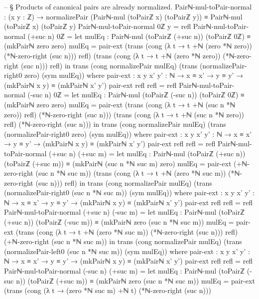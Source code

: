\documentclass[11pt,a4paper]{book}
\begin{document}
\begin{code}
-- § Products of canonical pairs are already normalized.
Pairℕ-mul-toPair-normal : (x y : ℤ) →
  normalizePair (Pairℕ-mul (toPairℤ x) (toPairℤ y)) ≡ Pairℕ-mul (toPairℤ x) (toPairℤ y)
Pairℕ-mul-toPair-normal 0ℤ y = refl
Pairℕ-mul-toPair-normal (+suc n) 0ℤ =
  let mulEq : Pairℕ-mul (toPairℤ (+suc n)) (toPairℤ 0ℤ) ≡ (mkPairℕ zero zero)
      mulEq =
        pair-ext
          (trans (cong (λ t → t +ℕ (zero *ℕ zero)) (*ℕ-zero-right (suc n))) refl)
          (trans (cong (λ t → t +ℕ (zero *ℕ zero)) (*ℕ-zero-right (suc n))) refl)
  in
  trans (cong normalizePair mulEq) (trans (normalizePair-right0 zero) (sym mulEq))
  where
    pair-ext : {x y x' y' : ℕ} → x ≡ x' → y ≡ y' → (mkPairℕ x y) ≡ (mkPairℕ x' y')
    pair-ext refl refl = refl
Pairℕ-mul-toPair-normal (-suc n) 0ℤ =
  let mulEq : Pairℕ-mul (toPairℤ (-suc n)) (toPairℤ 0ℤ) ≡ (mkPairℕ zero zero)
      mulEq =
        pair-ext
          (trans (cong (λ t → t +ℕ (suc n *ℕ zero)) refl) (*ℕ-zero-right (suc n)))
          (trans (cong (λ t → t +ℕ (suc n *ℕ zero)) refl) (*ℕ-zero-right (suc n)))
  in
  trans (cong normalizePair mulEq) (trans (normalizePair-right0 zero) (sym mulEq))
  where
    pair-ext : {x y x' y' : ℕ} → x ≡ x' → y ≡ y' → (mkPairℕ x y) ≡ (mkPairℕ x' y')
    pair-ext refl refl = refl
Pairℕ-mul-toPair-normal (+suc n) (+suc m) =
  let mulEq : Pairℕ-mul (toPairℤ (+suc n)) (toPairℤ (+suc m)) ≡ (mkPairℕ (suc n *ℕ suc m) zero)
      mulEq =
        pair-ext
          (+ℕ-zero-right (suc n *ℕ suc m))
          (trans
            (cong (λ t → t +ℕ (zero *ℕ suc m)) (*ℕ-zero-right (suc n)))
            refl)
  in
  trans (cong normalizePair mulEq)
    (trans (normalizePair-right0 (suc n *ℕ suc m)) (sym mulEq))
  where
    pair-ext : {x y x' y' : ℕ} → x ≡ x' → y ≡ y' → (mkPairℕ x y) ≡ (mkPairℕ x' y')
    pair-ext refl refl = refl
Pairℕ-mul-toPair-normal (+suc n) (-suc m) =
  let mulEq : Pairℕ-mul (toPairℤ (+suc n)) (toPairℤ (-suc m)) ≡ (mkPairℕ zero (suc n *ℕ suc m))
      mulEq =
        pair-ext
          (trans
            (cong (λ t → t +ℕ (zero *ℕ suc m)) (*ℕ-zero-right (suc n)))
            refl)
          (+ℕ-zero-right (suc n *ℕ suc m))
  in
  trans (cong normalizePair mulEq)
    (trans (normalizePair-left0 (suc n *ℕ suc m)) (sym mulEq))
  where
    pair-ext : {x y x' y' : ℕ} → x ≡ x' → y ≡ y' → (mkPairℕ x y) ≡ (mkPairℕ x' y')
    pair-ext refl refl = refl
Pairℕ-mul-toPair-normal (-suc n) (+suc m) =
  let mulEq : Pairℕ-mul (toPairℤ (-suc n)) (toPairℤ (+suc m)) ≡ (mkPairℕ zero (suc n *ℕ suc m))
      mulEq =
        pair-ext
          (trans
            (cong (λ t → (zero *ℕ suc m) +ℕ t) (*ℕ-zero-right (suc n)))

\end{code}
\end{document}
